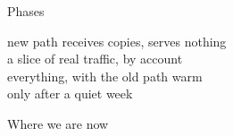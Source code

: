 \begin{frame}{Phases}
  \begin{console}
      new path receives copies, serves nothing\\
     a slice of real traffic, by account\\
     everything, with the old path warm\\
    only after a quiet week
  \end{console}
\end{frame}

\begin{frame}{Where we are now}
\end{frame}
